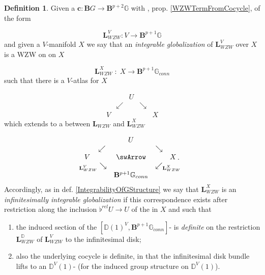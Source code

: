 \documentclass[12pt,titlepage]{article}
\def\mathllap{\mathpalette\mathllapinternal}
\def\mathrlap{\mathpalette\mathrlapinternal}
\def\mathllapinternal#1#2{\llap{$\mathsurround=0pt#1{#2}$}}
\def\mathrlapinternal#1#2{\rlap{$\mathsurround=0pt#1{#2}$}}
\newcommand{\itexarray}[1]{\begin{matrix}#1\end{matrix}}
\theoremstyle{plain}
\theoremstyle{definition}
\newtheorem{defn}{Definition}
\theoremstyle{remark}
\begin{document}
\begin{defn}
\label{DefiniteGlobalizationofWZWTerm}\hypertarget{DefiniteGlobalizationofWZWTerm}{}
Given a  $\mathbf{c} \colon \mathbf{B}G\to\mathbf{B}^{p+2}\mathbb{G}$ with , prop. \ref{WZWTermFromCocycle}, of the form

\begin{displaymath}
\mathbf{L}_{WZW}^V
  \colon
  V \longrightarrow \mathbf{B}^{p+1}\mathbb{G}
\end{displaymath}
and given a $V$-manifold $X$ we say that an \emph{integrable globalization} of $\mathbf{L}_{WZW}^V$ over $X$ is a WZW on on $X$

\begin{displaymath}
\mathbf{L}_{WZW}^X \;\colon\;X \longrightarrow \mathbf{B}^{p+1}\mathbb{G}_{conn}
\end{displaymath}
such that there is a $V$-atlas for $X$

\begin{displaymath}
\itexarray{
     && U
     \\
     & \swarrow && \searrow
     \\
     V && && X
  }
\end{displaymath}
which extends to a  between $\mathbf{L}_{WZW}$ and $\mathbf{L}_{WZW}^X$

\begin{displaymath}
\itexarray{
     && U
     \\
     & \swarrow && \searrow
     \\
     V && \swArrow && X
     \\
     & {}_{\mathllap{\mathbf{L}_{WZW}^V}}\searrow && \swarrow_{\mathrlap{\mathbf{L}_{WZW}^X}}
     \\
     && \mathbf{B}^{p+1}\mathbb{G}_{conn}
  }
  \,.
\end{displaymath}
Accordingly, as in def. \ref{IntegrabilityOfGStructure} we say that $\mathbf{L}_{WZW}^X$ is an \emph{infinitesimally integrable globalization} if this correspondence exists after restriction along the inclusion $\flat^{rel} U \to U$ of the  in $X$ and such that

\begin{enumerate}%
\item the induced section of the  $[\mathbb{D}(1)^V,\mathbf{B}^{p+1}\mathbb{G}_{conn}]$- is \emph{definite} on the restriction $\mathbf{L}_{WZW}^{\mathbb{D}}$ of $\mathbf{L}_{WZW}^V$ to the infinitesimal disk;


\item also the underlying cocycle is definite, in that the infinitesimal disk bundle lifts to an $\mathbb{D}^V(1)$- (for the induced group structure on $\mathbb{D}^V(1)$).



\end{enumerate}
\end{defn}
\end{document}
